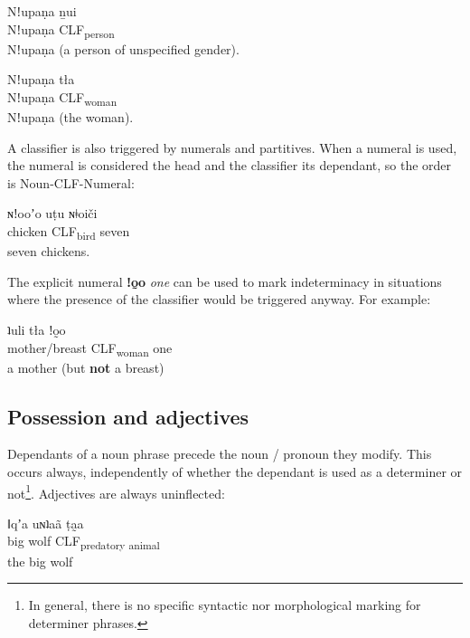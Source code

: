 \documentclass[11pt,a5paper]{book}
\newcommand{\qcn}[1]{\textcolor{AccentText}{\large\textbf{#1}}}
\newcommand{\transl}[2]{\qcn{#1} \emph{#2}}
\newcommand{\grammsc}[1]{\textsc{#1}}
\newcommand{\CLF}[1]{\grammsc{CLF}\textsubscript{#1}}
\begin{document}
\begin{exe}
\ex
\gll Nǃupaṇa ṉui\\
Nǃupaṇa 	\CLF{person}\\
\glt  Nǃupaṇa (a person of unspecified gender).
\end{exe}

\begin{exe}
\ex
\gll Nǃupaṇa 	tła\\
Nǃupaṇa 	\CLF{woman}\\
\glt Nǃupaṇa (the woman).
\end{exe}

A classifier is also triggered by numerals and partitives. When a numeral is used, the numeral is considered the head and the classifier its dependant, so the order is Noun-CLF-Numeral:

\begin{exe}
\ex
\gll ɴǃooʼo uṭu ɴǂoiči\\
chicken \CLF{bird} seven\\
\glt seven chickens.
\end{exe}

The explicit numeral \transl{ǃo̰o}{one} can be used to mark indeterminacy in situations where the presence of the classifier would be triggered anyway. For example:

\begin{exe}
\ex
\gll ʇuli tła ǃo̰o\\
mother/breast \CLF{woman} one\\
\glt a mother (but \textbf{not} a breast)
\end{exe}





\subsection{Possession and adjectives}

Dependants of a noun phrase precede the noun / pronoun they modify. This occurs always, independently of whether the dependant is used as a determiner or not\footnote{In general, there is no specific syntactic nor morphological marking for determiner phrases.}. Adjectives are always uninflected:

\begin{exe}
\ex
\gll ǁqʼa uɴʇaã ṭa̰a\\
big wolf \CLF{predatory animal}\\
\glt the big wolf
\end{exe}
\end{document}
